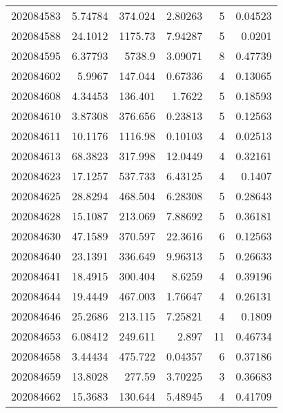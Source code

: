 \begin{tabular}{rrrrrr}
 202084583 &          5.74784 &      374.024  &            2.80263 &           5 & 0.04523 \\
 202084588 &         24.1012  &     1175.73   &            7.94287 &           5 & 0.0201  \\
 202084595 &          6.37793 &     5738.9    &            3.09071 &           8 & 0.47739 \\
 202084602 &          5.9967  &      147.044  &            0.67336 &           4 & 0.13065 \\
 202084608 &          4.34453 &      136.401  &            1.7622  &           5 & 0.18593 \\
 202084610 &          3.87308 &      376.656  &            0.23813 &           5 & 0.12563 \\
 202084611 &         10.1176  &     1116.98   &            0.10103 &           4 & 0.02513 \\
 202084613 &         68.3823  &      317.998  &           12.0449  &           4 & 0.32161 \\
 202084623 &         17.1257  &      537.733  &            6.43125 &           4 & 0.1407  \\
 202084625 &         28.8294  &      468.504  &            6.28308 &           5 & 0.28643 \\
 202084628 &         15.1087  &      213.069  &            7.88692 &           5 & 0.36181 \\
 202084630 &         47.1589  &      370.597  &           22.3616  &           6 & 0.12563 \\
 202084640 &         23.1391  &      336.649  &            9.96313 &           5 & 0.26633 \\
 202084641 &         18.4915  &      300.404  &            8.6259  &           4 & 0.39196 \\
 202084644 &         19.4449  &      467.003  &            1.76647 &           4 & 0.26131 \\
 202084646 &         25.2686  &      213.115  &            7.25821 &           4 & 0.1809  \\
 202084653 &          6.08412 &      249.611  &            2.897   &          11 & 0.46734 \\
 202084658 &          3.44434 &      475.722  &            0.04357 &           6 & 0.37186 \\
 202084659 &         13.8028  &      277.59   &            3.70225 &           3 & 0.36683 \\
 202084662 &         15.3683  &      130.644  &            5.48945 &           4 & 0.41709 \\

\end{tabular}
